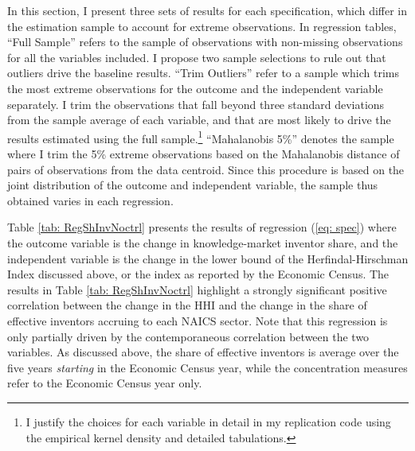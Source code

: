 In this section, I present three sets of results for each specification,
which differ in the estimation sample to account for extreme observations.
In regression tables, ``Full Sample'' refers to the sample of observations
with non-missing observations for all the variables included. I propose
two sample selections to rule out that outliers drive the baseline
results. ``Trim Outliers'' refer to a sample which trims the most
extreme observations for the outcome and the independent variable
separately. I trim the observations that fall beyond three standard
deviations from the sample average of each variable, and that are
most likely to drive the results estimated using the full sample.\footnote{I justify the choices for each variable in detail in my replication
code using the empirical kernel density and detailed tabulations.} ``Mahalanobis 5\%'' denotes the sample where I trim the 5\% extreme
observations based on the Mahalanobis distance of pairs of observations
from the data centroid. Since this procedure is based on the joint
distribution of the outcome and independent variable, the sample thus
obtained varies in each regression.

Table \ref{tab: RegShInvNoctrl} presents the results of regression
(\ref{eq: spec}) where the outcome variable is the change in knowledge-market
inventor share, and the independent variable is the change in the
lower bound of the Herfindal-Hirschman Index discussed above, or the
index as reported by the Economic Census. The results in Table \ref{tab: RegShInvNoctrl}
highlight a strongly significant positive correlation between the
change in the HHI and the change in the share of effective inventors
accruing to each NAICS sector. Note that this regression is only partially
driven by the contemporaneous correlation between the two variables.
As discussed above, the share of effective inventors is average over
the five years \emph{starting }in the Economic Census year, while
the concentration measures refer to the Economic Census year only. 

